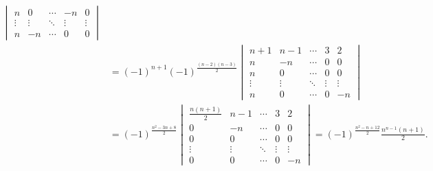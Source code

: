 \documentclass[12pt,fontset=fandol]{ctexart}
\begin{document}
\begin{solve}
\begin{enumerate}
\begin{enumerate}
\begin{align*}
\begin{vmatrix}
                                                       n      & 0      & \cdots & -n     & 0      \\
                                                       \vdots & \vdots & \ddots & \vdots & \vdots \\
                                                       n      & -n     & \cdots & 0      & 0
                                                   \end{vmatrix}                                   \\
                                      & =(-1)^{n+1}(-1)^{\frac{(n-2)(n-3)}{2}}
                                    \begin{vmatrix}
                                        n+1    & n-1    & \cdots & 3      & 2      \\
                                        n      & -n     & \cdots & 0      & 0      \\
                                        n      & 0      & \cdots & 0      & 0      \\
                                        \vdots & \vdots & \ddots & \vdots & \vdots \\
                                        n      & 0      & \cdots & 0      & -n
                                    \end{vmatrix}                                                  \\
                                      & =(-1)^{\frac{n^2-3n+8}{2}}\begin{vmatrix}
                                                                      \frac{n(n+1)}{2} & n-1    & \cdots & 3      & 2      \\
                                                                      0                & -n     & \cdots & 0      & 0      \\
                                                                      0                & 0      & \cdots & 0      & 0      \\
                                                                      \vdots           & \vdots & \ddots & \vdots & \vdots \\
                                                                      0                & 0      & \cdots & 0      & -n
                                                                  \end{vmatrix}=(-1)^{\frac{n^2-n+12}{2}}\frac{n^{n-1}(n+1)}{2}.
                                \end{align*}


\end{enumerate}
\end{enumerate}
\end{solve}
\end{document}
